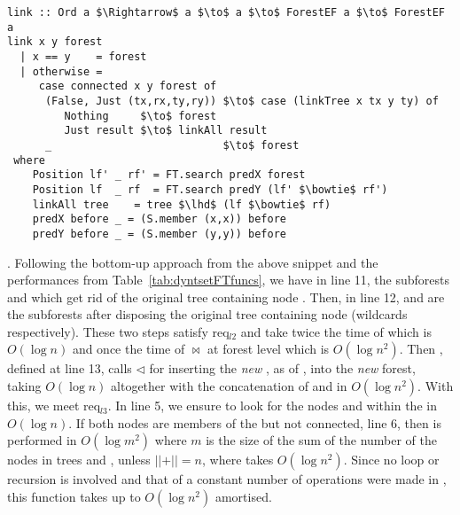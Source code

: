 \begin{lstlisting}[mathescape] 
link :: Ord a $\Rightarrow$ a $\to$ a $\to$ ForestEF a $\to$ ForestEF a 
link x y forest 
  | x == y    = forest  
  | otherwise = 
     case connected x y forest of 
      (False, Just (tx,rx,ty,ry)) $\to$ case (linkTree x tx y ty) of
         Nothing     $\to$ forest
         Just result $\to$ linkAll result 
      _                           $\to$ forest 
 where 
    Position lf' _ rf' = FT.search predX forest 
    Position lf  _ rf  = FT.search predY (lf' $\bowtie$ rf') 
    linkAll tree    = tree $\lhd$ (lf $\bowtie$ rf)
    predX before _ = (S.member (x,x)) before 
    predY before _ = (S.member (y,y)) before 
\end{lstlisting}
. Following the bottom-up approach from the above snippet and the performances from Table~\ref{tab:dyntsetFTfuncs}, we have in line 11, the subforests  and  which get rid of the original tree containing node . Then, in line 12,  and  are the subforests after disposing the original tree containing node  (wildcards \code{_} respectively). These two steps satisfy req$_{l2}$ and take twice the time of  which is $O(\log n)$ and once the time of $\bowtie$ at forest level which is $O(\log n^2)$. Then , defined at line 13, calls $\lhd$ for inserting the \textit{new} , as  of , into the \textit{new} forest, taking $O(\log n)$ altogether with the concatenation of  and  in $O(\log n^2)$. With this, we meet req$_{l3}$. In line 5, we ensure to look for the nodes  and  within the  in $O(\log n)$. If both nodes are members of the  but not connected, line 6, then  is performed in $O(\log m^2)$ where $m$ is the size of the sum of the number of the nodes in trees  and , unless $\vert$$\vert + \vert$$\vert = n$, where  takes $O(\log n^2)$. Since no loop or recursion is involved and that of a constant number of operations were made in \link, this function takes up to $O(\log n^2)$ amortised.




